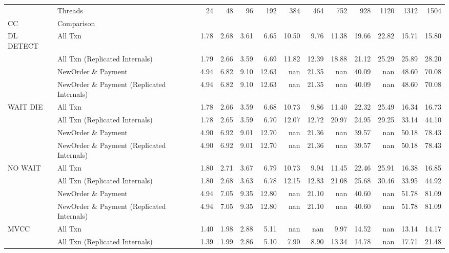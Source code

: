 \begin{tabular}{llrrrrrrrrrrr}
\toprule
       & Threads &  24   &  48   &  96   &  192  &  384  &  464  &  752  &  928  &  1120 &  1312 &  1504 \\
CC & Comparison &       &       &       &       &       &       &       &       &       &       &       \\
\midrule
DL DETECT & All Txn &  1.78 &  2.68 &  3.61 &  6.65 & 10.50 &  9.76 & 11.38 & 19.66 & 22.82 & 15.71 & 15.80 \\
       & All Txn (Replicated Internals) &  1.79 &  2.66 &  3.59 &  6.69 & 11.82 & 12.39 & 18.88 & 21.12 & 25.29 & 25.89 & 28.20 \\
       & NewOrder \& Payment &  4.94 &  6.82 &  9.10 & 12.63 &   nan & 21.35 &   nan & 40.09 &   nan & 48.60 & 70.08 \\
       & NewOrder \& Payment (Replicated Internals) &  4.94 &  6.82 &  9.10 & 12.63 &   nan & 21.35 &   nan & 40.09 &   nan & 48.60 & 70.08 \\
WAIT DIE & All Txn &  1.78 &  2.66 &  3.59 &  6.68 & 10.73 &  9.86 & 11.40 & 22.32 & 25.49 & 16.34 & 16.73 \\
       & All Txn (Replicated Internals) &  1.78 &  2.65 &  3.59 &  6.70 & 12.07 & 12.72 & 20.97 & 24.95 & 29.25 & 33.14 & 44.10 \\
       & NewOrder \& Payment &  4.90 &  6.92 &  9.01 & 12.70 &   nan & 21.36 &   nan & 39.57 &   nan & 50.18 & 78.43 \\
       & NewOrder \& Payment (Replicated Internals) &  4.90 &  6.92 &  9.01 & 12.70 &   nan & 21.36 &   nan & 39.57 &   nan & 50.18 & 78.43 \\
NO WAIT & All Txn &  1.80 &  2.71 &  3.67 &  6.79 & 10.73 &  9.94 & 11.45 & 22.46 & 25.91 & 16.38 & 16.85 \\
       & All Txn (Replicated Internals) &  1.80 &  2.68 &  3.63 &  6.78 & 12.15 & 12.83 & 21.08 & 25.68 & 30.46 & 33.95 & 44.92 \\
       & NewOrder \& Payment &  4.94 &  7.05 &  9.35 & 12.80 &   nan & 21.10 &   nan & 40.60 &   nan & 51.78 & 81.09 \\
       & NewOrder \& Payment (Replicated Internals) &  4.94 &  7.05 &  9.35 & 12.80 &   nan & 21.10 &   nan & 40.60 &   nan & 51.78 & 81.09 \\
MVCC & All Txn &  1.40 &  1.98 &  2.88 &  5.11 &   nan &   nan &  9.97 & 14.52 &   nan & 13.14 & 14.17 \\
       & All Txn (Replicated Internals) &  1.39 &  1.99 &  2.86 &  5.10 &  7.90 &  8.90 & 13.34 & 14.78 &   nan & 17.71 & 21.48 \\

\end{tabular}
